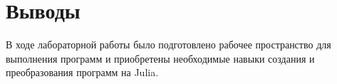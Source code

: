 \documentclass[
  english,
  russian,
  12pt,
  a4paper,
  DIV=11,
  numbers=noendperiod]{scrreprt}
\begin{document}
\chapter{Выводы}\label{ux432ux44bux432ux43eux434ux44b}

В ходе лабораторной работы было подготовлено рабочее пространство для
выполнения программ и приобретены необходимые навыки создания и
преобразования программ на Julia.


\printbibliography
\end{document}
